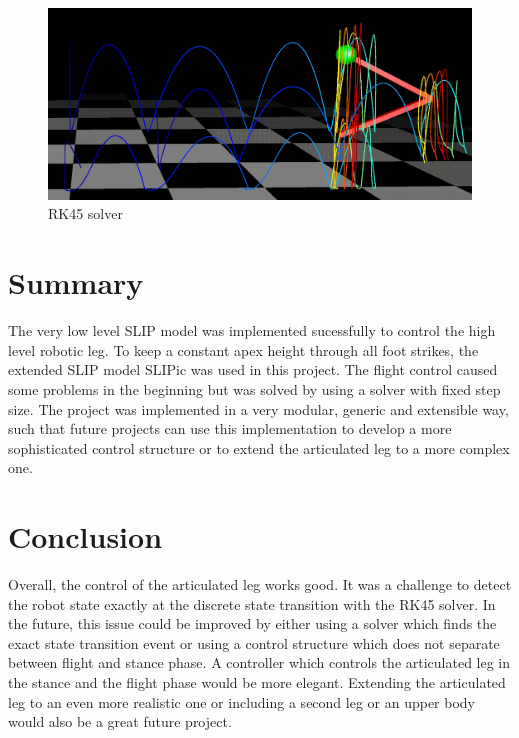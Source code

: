 \documentclass[journal,onecolumn]{IEEEtran}
\begin{document}
	\begin{figure}[h]
		\centering
		\includegraphics[scale=0.074]{"assets/solver_rk45.png"}
		\caption{RK45 solver}
		\label{fig:RK45 solver}
	\end{figure}
	
	\section{Summary}
	The very low level SLIP model was implemented sucessfully to control the high level robotic leg. To keep a constant apex 
	height through all foot strikes, the extended SLIP model SLIPic was used in this project. The flight control caused some problems in the beginning but was solved by using a 
	solver with fixed step size. The project was implemented in a very modular, generic and extensible way, such that future projects can use this implementation to 
	develop a more sophisticated control structure or to extend the articulated leg to a more complex one.
	
	\section{Conclusion}
	Overall, the control of the articulated leg works good. It was a challenge to detect the robot state exactly at the discrete state transition with the RK45 solver.
	In the future, this issue could be improved by either using a solver which finds the exact state transition event or using a control structure which does not 
	separate between flight and stance phase. A controller which controls the articulated leg in the stance and the flight phase would be more elegant. 
	Extending the articulated leg to an even more realistic one or including a second leg or an upper body would also be a great future project.
	
	
	\addtolength{\textheight}{-12cm}   %
	
	\nocite{*}
	
	
	

	
\end{document}
